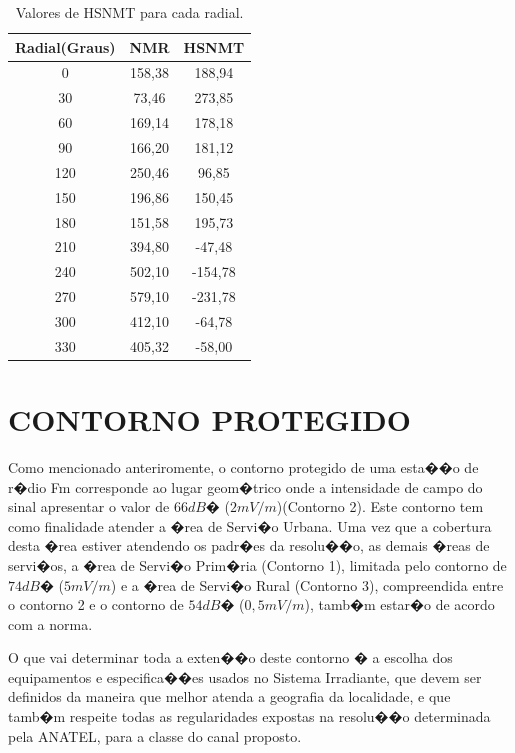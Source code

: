 \def\tablename{Tabela}
\begin{table}
\vspace*{0.05cm}
\centering

\begin{tabular}{|c|c|c|} \hline

Radial(Graus) & NMR & HSNMT \\ \hline
0 & 158,38&188,94\\
30 & 73,46 & 273,85\\
60 & 169,14 & 178,18\\
90 & 166,20 & 181,12\\
120 & 250,46 & 96,85\\
150 & 196,86 & 150,45\\
180 & 151,58 & 195,73\\
210 & 394,80 & -47,48\\
240 & 502,10 & -154,78\\

270 & 579,10 & -231,78\\
300 & 412,10 & -64,78\\
330 & 405,32 & -58,00\\ \hline

\end{tabular}
\caption{Valores de HSNMT para cada radial.}
\label{tabelaHSNMT}
\end{table}

\section{CONTORNO PROTEGIDO}

Como mencionado anteriromente, o contorno protegido de uma esta��o de r�dio Fm corresponde ao lugar
geom�trico onde a intensidade de campo do sinal apresentar o valor de $66 dB�$ ($2 mV/m$)(Contorno 2). 
Este contorno tem como finalidade atender a �rea de Servi�o Urbana. Uma vez que a cobertura desta �rea estiver atendendo os padr�es da resolu��o,
as demais �reas de servi�os, a �rea de Servi�o Prim�ria (Contorno 1), limitada pelo contorno de $74 dB�$ ($5 mV/m$) e a �rea de Servi�o Rural (Contorno 3),
 compreendida entre o contorno 2 e o contorno de $54 dB�$ ($0,5 mV/m$), tamb�m estar�o de acordo com a norma.

O que vai determinar toda a exten��o deste contorno � a escolha dos equipamentos e especifica��es usados no Sistema Irradiante, que devem ser definidos da maneira
que melhor atenda a geografia da localidade, e que tamb�m respeite todas as regularidades expostas na resolu��o determinada pela ANATEL, para a classe do canal proposto.  

